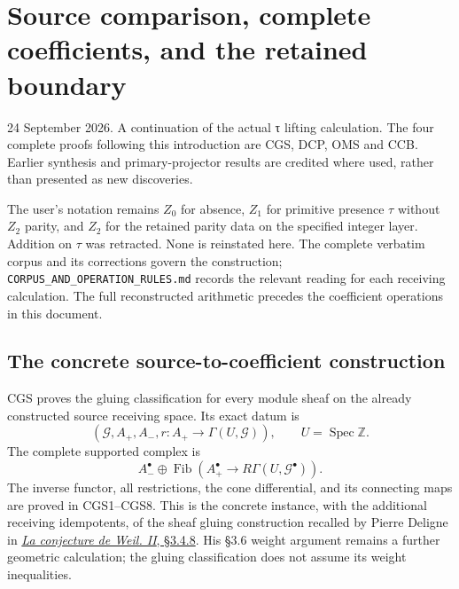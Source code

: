 \section{Source comparison, complete coefficients, and the retained
boundary}\label{source-comparison-complete-coefficients-and-the-retained-boundary}

24 September 2026. A continuation of the actual τ lifting calculation.
The four complete proofs following this introduction are CGS, DCP, OMS
and CCB. Earlier synthesis and primary-projector results are credited
where used, rather than presented as new discoveries.

The user's notation remains \(Z_0\) for absence, \(Z_1\) for primitive
presence \(\tau\) without \(Z_2\) parity, and \(Z_2\) for the retained
parity data on the specified integer layer. Addition on \(\tau\) was
retracted. None is reinstated here. The complete verbatim corpus and its
corrections govern the construction; \nolinkurl{CORPUS_AND_OPERATION_RULES.md}
records the relevant reading for each receiving calculation. The full
reconstructed arithmetic precedes the coefficient operations in this
document.

\subsection{The concrete source-to-coefficient
construction}\label{the-concrete-source-to-coefficient-construction}

CGS proves the gluing classification for every module sheaf on the
already constructed source receiving space. Its exact datum is \[
(\mathcal G,A_+,A_-,r:A_+\longrightarrow\Gamma(U,\mathcal G)),
\qquad U=\operatorname{Spec}\mathbb Z.
\] The complete supported complex is \[
A_-^\bullet\oplus\operatorname{Fib}
\left(A_+^\bullet\longrightarrow R\Gamma(U,\mathcal G^\bullet)\right).
\] The inverse functor, all restrictions, the cone differential, and its
connecting maps are proved in CGS1--CGS8. This is the concrete instance,
with the additional receiving idempotents, of the sheaf gluing
construction recalled by Pierre Deligne in
\href{https://www.numdam.org/item/PMIHES_1980__52__137_0/}{\emph{La
conjecture de Weil. II}, §3.4.8}. His §3.6 weight argument remains a
further geometric calculation; the gluing classification does not assume
its weight inequalities.

